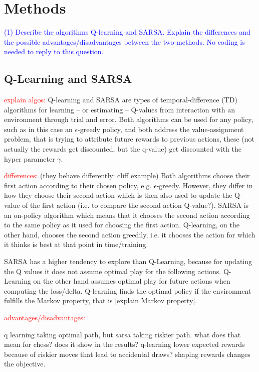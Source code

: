 \documentclass[conference]{IEEEtran}
\begin{document}
\section{Methods}\label{sec:methods}

\textcolor{blue}{(1) Describe the algorithms Q-learning and SARSA. Explain the differences and the possible advantages/disadvantages between the two methods. No coding is needed to reply to this question.}

\subsection{Q-Learning and SARSA}

\textcolor{red}{explain algos: }Q-learning and SARSA are types of temporal-difference (TD) algorithms for learning -- or estimating -- Q-values from interaction with an environment through trial and error. Both algorithms can be used for any policy, such as in this case an $\epsilon$-greedy policy, and both address the value-assignment problem, that is trying to attribute future rewards to previous actions, these (not actually the rewards get discounted, but the q-value) get discounted with the hyper parameter $\gamma$.

\textcolor{red}{differences: }(they behave differently: cliff example) Both algorithms choose their first action according to their chosen policy, e.g. $\epsilon$-greedy. However, they differ in how they choose their second action which is then also used to update the Q-value of the first action (i.e. to compare the second action Q-value?). SARSA is an on-policy algorithm which means that it chooses the second action according to the same policy as it used for choosing the first action. Q-learning, on the other hand, chooses the second action greedily, i.e. it chooses the action for which it thinks is best at that point in time/training.

SARSA has a higher tendency to explore than Q-Learning, because for updating the Q values it does not assume optimal play for the following actions. Q-Learning on the other hand assumes optimal play for future actions when computing the loss/delta. Q-learning finds the optimal policy if the environment fulfills the Markov property, that is [explain Markov property].

\textcolor{red}{advantages/disadvantages: }

q learning taking optimal path, but sarsa taking riskier path. what does that mean for chess? does it show in the results? q-learning lower expected rewards because of riskier moves that lead to accidental draws?
shaping rewards changes the objective.
\end{document}
